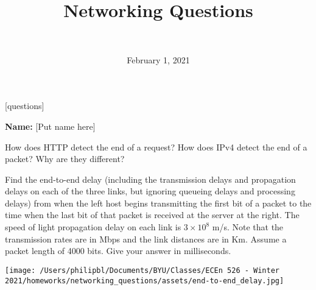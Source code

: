 \documentclass[
  addpoints, answers]{exam}
\title{Networking Questions}
\author{ \\ }
\date{February 1, 2021}
\begin{document}
\maketitle

\begin{center}
  \vspace{1cm}
  [questions]
  \vspace{1cm}
\end{center}

{\large \textbf{Name:} [Put name here]}


\newpage


\begin{questions}


\question[3] How does HTTP detect the end of a request? How does IPv4 detect the end of a packet? Why are they different?

\begin{solution}
\end{solution}


\newpage


\question[3] Find the end-to-end delay (including the transmission delays and propagation delays on each of the three links, but ignoring queueing delays and processing delays) from when the left host begins transmitting the first bit of a packet to the time when the last bit of that packet is received at the server at the right. The speed of light propagation delay on each link is $3 \times 10^8$ m/s. Note that the transmission rates are in Mbps and the link distances are in Km. Assume a packet length of 4000 bits. Give your answer in milliseconds.
\begin{center}
\texttt{[image: /Users/philipbl/Documents/BYU/Classes/ECEn 526 - Winter 2021/homeworks/networking\_questions/assets/end-to-end\_delay.jpg]}
\end{center}

\end{questions}
\end{document}
